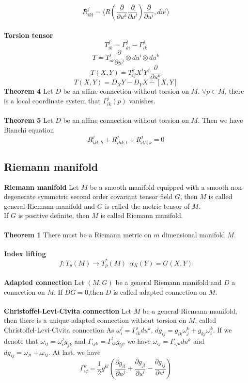 \documentclass{article}
\begin{document}
\[R^{j}_{ikl} = \langle R(\frac{\partial}{\partial u^k} \frac{\partial}{\partial u^l})\frac{\partial}{\partial u^i},du^j \rangle\]\\
\textbf{Torsion tensor}
\[T^j_{ik} = \Gamma^j_{ki} - \Gamma^j_{ik}\]
\[T = T^j_{ik} \frac{\partial}{\partial u^j} \otimes du^i \otimes du^k\]
\[T(X,Y) = T^k_{ij}X^i Y^j \frac{\partial}{\partial u^k}\]
\[T(X,Y) = D_X Y - D_Y X - [X,Y]\]
\textbf{Theorem 4} Let $D$ be an affine connection without torsion on $M$. $\forall p \in M$, there is a local coordinate system that $\Gamma^j_{ik}(p)$ vanishes.\\ \\
\textbf{Theorem 5} Let $D$ be an affine connection without torsion on $M$. Then we have Bianchi equation
\[R^j_{ikl;h} + R^j_{ihk;l} + R^j_{ilh;k} = 0\]

\subsection{Riemann manifold}
\textbf{Riemann manifold} Let $M$ be a smooth manifold equipped with a smooth non-degenerate symmetric second order covariant tensor field $G$, then $M$ is called general Riemann manifold and $G$ is called the metric tensor of $M$.\\
If $G$ is positive definite, then $M$ is called Riemann manifold.\\ \\
\textbf{Theorem 1} There must be a Riemann metric on $m$ dimensional manifold $M$.\\ \\
\textbf{Index lifting}\\
\[f:T_p(M) \to T^*_p(M) \ \ \alpha_X(Y) = G(X,Y)\]\\
\textbf{Adapted connection} Let $(M,G)$ be a general Riemann manifold and $D$ a connection on $M$. If $DG=0$,then $D$ is called adapted connection on $M$. \\ \\
\textbf{Christoffel-Levi-Civita connection} Let $M$ be a general Riemann manifold, then there is a unique adapted connection without torsion on $M$, called Christoffel-Levi-Civita connection As $\omega^{j}_{i} = \Gamma^{j}_{ik}du^k$, $dg_{ij} = g_{ik}\omega^{k}_{j} + g_{kj}\omega^{k}_{i}$.
If we denote that $\omega_{ij} = \omega_{i}^{j}g_{jk}$ and $\Gamma_{ijk} = \Gamma_{ik}^{l}g_{lj}$, we have $\omega_{ij}=\Gamma_{ijk}du^k$ and $dg_{ij} = \omega_{ji}+ \omega_{ij}$.
At last, we have
\[\Gamma^{k}_{ij} = \frac{1}{2} g^{kl}(\frac{\partial g_{il}}{\partial u^j} + \frac{\partial g_{jl}}{\partial u^i} - \frac{\partial g_{ij}}{\partial u^l})\]\\
\end{document}
